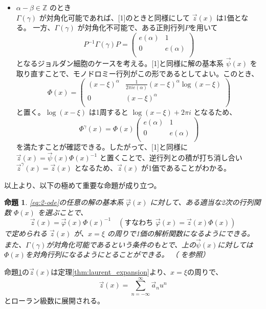 \documentclass[paper=a4, fontsize=11pt]{jlreq} %
\theoremstyle{break}
\newtheorem{proposition}[theorem]{命題}
\theoremstyle{qa}
\theoremstyle{remark} %
\begin{document}
\begin{itemize}
    \item[\textbf{[2]}] $\alpha-\beta \in \mathbb{Z}$ のとき\\
    $\Gamma(\gamma)$ が対角化可能であれば、[1]のときと同様にして $\vec{z}(x)$ は1価となる。
    一方、$\Gamma(\gamma)$ が対角化不可能で、ある正則行列$P$を用いて
    \[
    P^{-1}\Gamma(\gamma)P=
    \begin{pmatrix}
        e(\alpha) & 1 \\
        0 & e(\alpha) \\
    \end{pmatrix}
    \]
    となるジョルダン細胞のケースを考える。[1]と同様に解の基本系 $\vec{\psi}(x)$ を取り直すことで、モノドロミー行列がこの形であるとしてよい。このとき、
    \[
    \Phi(x)=
    \begin{pmatrix}
        (x-\xi)^{\alpha} & \frac{1}{2\pi i e(\alpha)}(x-\xi)^{\alpha}\log(x-\xi) \\
        0 & (x-\xi)^{\alpha} \\
    \end{pmatrix}
    \]
    と置く。$\log(x-\xi)$ は1周すると $\log(x-\xi) + 2\pi i$ となるため、
    \[
    \Phi^{\gamma}(x)= \Phi(x)
    \begin{pmatrix}
        e(\alpha) & 1 \\
        0 & e(\alpha) \\
    \end{pmatrix}
    \]
    を満たすことが確認できる。したがって、[1]と同様に $\vec{z}(x)=\vec{\psi}(x)\Phi(x)^{-1}$ と置くことで、逆行列との積が打ち消し合い $\vec{z}^{\gamma}(x) = \vec{z}(x)$ となるため、$\vec{z}(x)$ が1価であることがわかる。
\end{itemize}

以上より、以下の極めて重要な命題が成り立つ。

\begin{proposition}\label{prop:single_valued_z}
    \eqref{eq:2-ode}の任意の解の基本系 $\vec{\varphi}(x)$ に対して、ある適当な2次の行列関数 $\Phi(x)$ を選ぶことで、
    \[
    \vec{z}(x)=\vec{\varphi}(x)\Phi(x)^{-1} \quad (\text{すなわち } \vec{\varphi}(x) = \vec{z}(x)\Phi(x))
    \]
    で定められる $\vec{z}(x)$ が、$x=\xi$ の周りで1価の解析関数になるようにできる。\\
    また、$\Gamma(\gamma)$が対角化可能であるという条件のもとで、上の$\vec{\psi}(x)$に対しては$\Phi(x)$を対角行列になるようにとることができる。
    （\cite[p.59 命題2.5]{book:okamoto} を参照）
\end{proposition}

命題\ref{prop:single_valued_z}の$\vec{z}(x)$は定理\ref{thm:laurent_expansion}より、$x=\xi$の周りで、
\begin{equation}\label{eq:power_series_z}
\vec{z}(x)=\sum_{n=-\infty}^{\infty}\vec{a}_{n}u^{n}
\end{equation}
とローラン級数に展開される。
\end{document}

